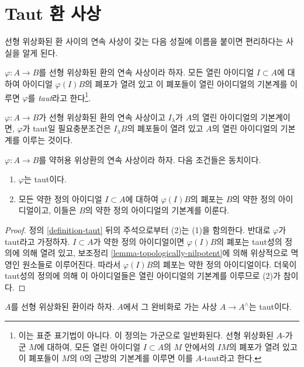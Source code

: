 \section{Taut 환 사상}
\label{section-taut-ring-maps}

\noindent
선형 위상화된 환 사이의 연속 사상이 갖는 다음 성질에 이름을 붙이면
편리하다는 사실을 알게 된다.

\begin{definition}
\label{definition-taut}
$\varphi : A \to B$를 선형 위상화된 환의 연속 사상이라 하자.
모든 열린 아이디얼 $I \subset A$에 대하여 아이디얼
$\varphi(I)B$의 폐포가 열려 있고 이 폐포들이 열린 아이디얼의
기본계를 이루면 $\varphi$를 {\it taut}라고 한다\footnote{이는
표준 표기법이 아니다. 이 정의는 가군으로 일반화된다. 선형 위상화된
$A$-가군 $M$에 대하여, 모든 열린 아이디얼 $I \subset A$의
$M$ 안에서의 $IM$의 폐포가 열려 있고 이 폐포들이 $M$의 $0$의
근방의 기본계를 이루면 이를 $A$-taut라고 한다.}.
\end{definition}

\noindent
$\varphi : A \to B$가 선형 위상화된 환의 연속 사상이고
$I_\lambda$가 $A$의 열린 아이디얼의 기본계이면, $\varphi$가
taut일 필요충분조건은 $I_\lambda B$의 폐포들이 열려 있고
$A$의 열린 아이디얼의 기본계를 이루는 것이다.

\begin{lemma}
\label{lemma-taut-weakly-admissible}
$\varphi : A \to B$를 약허용 위상환의 연속 사상이라 하자.
다음 조건들은 동치이다.
\begin{enumerate}
\item $\varphi$는 taut이다.
\item 모든 약한 정의 아이디얼 $I \subset A$에 대하여
$\varphi(I)B$의 폐포는 $B$의 약한 정의 아이디얼이고, 이들은
$B$의 약한 정의 아이디얼의 기본계를 이룬다.
\end{enumerate}
\end{lemma}

\begin{proof}
정의 \ref{definition-taut} 뒤의 주석으로부터 (2)는 (1)을 함의한다.
반대로 $\varphi$가 taut라고 가정하자. $I \subset A$가 약한 정의
아이디얼이면 $\varphi(I)B$의 폐포는 taut성의 정의에 의해 열려 있고,
보조정리 \ref{lemma-topologically-nilpotent}에 의해 위상적으로
멱영인 원소들로 이루어진다. 따라서 $\varphi(I)B$의 폐포는 약한
정의 아이디얼이다. 더욱이 taut성의 정의에 의해 이 아이디얼들은
열린 아이디얼의 기본계를 이루므로 (2)가 참이다.
\end{proof}

\begin{lemma}
\label{lemma-completion-taut}
$A$를 선형 위상화된 환이라 하자. $A$에서 그 완비화로 가는 사상
$A \to A^\wedge$는 taut이다.
\end{lemma}

